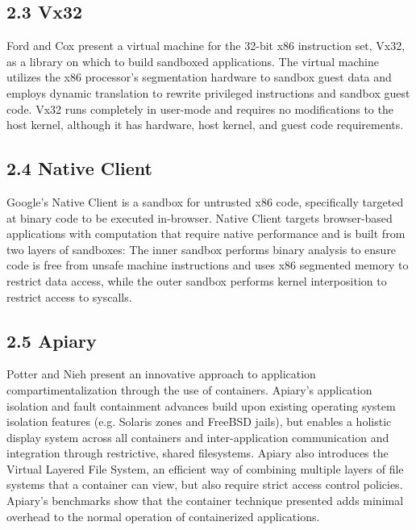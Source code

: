 \documentclass{proc}
\begin{document}
\subsection*{2.3 Vx32}

Ford and Cox \cite{ford2008vx32} present a virtual machine for the 32-bit x86 instruction set, Vx32, as a library on which to build sandboxed applications. The virtual machine utilizes the x86 processor's segmentation hardware to sandbox guest data and employs dynamic translation to rewrite privileged instructions and sandbox guest code. Vx32 runs completely in user-mode and requires no modifications to the host kernel, although it has hardware, host kernel, and guest code requirements.

\subsection*{2.4 Native Client}

Google's Native Client \cite{yee2009native} is a sandbox for untrusted x86 code, specifically targeted at binary code to be executed in-browser. Native Client targets browser-based applications with computation that require native performance and is built from two layers of sandboxes: The inner sandbox performs binary analysis to ensure code is free from unsafe machine instructions and uses x86 segmented memory to restrict data access, while the outer sandbox performs kernel interposition to restrict access to syscalls.

\subsection*{2.5 Apiary}

Potter and Nieh \cite{potter2010apiary} present an innovative approach to application compartimentalization through the use of containers. Apiary's application isolation and fault containment advances build upon existing operating system isolation features (e.g. Solaris zones and FreeBSD jails), but enables a holistic display system across all containers and inter-application communication and integration through restrictive, shared filesystems. Apiary also introduces the Virtual Layered File System, an efficient way of combining multiple layers of file systems that a container can view, but also require strict access control policies. Apiary's benchmarks show that the container technique presented adds minimal overhead to the normal operation of containerized applications.
\end{document}
